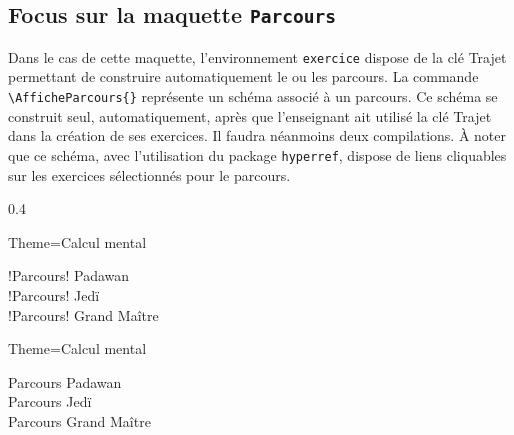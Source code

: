 \documentclass[12pt,french]{article}
\newcommand\Cle[1]{%
  {\sffamily\textlangle #1\textrangle}%
}%
\begin{document}
\subsection*{Focus sur la maquette \lstinline!Parcours!}
Dans le cas de cette maquette, l'environnement \lstinline!exercice! dispose de la clé \Cle{Trajet} permettant de construire automatiquement le ou les parcours. La commande \lstinline!\AfficheParcours{}! représente un schéma associé à un parcours. Ce schéma se construit seul, automatiquement, après que l'enseignant ait utilisé la clé \Cle{Trajet} dans la création de ses exercices. Il faudra néanmoins deux compilations. \`A noter que ce schéma, avec l'utilisation du package \lstinline!hyperref!, dispose de liens cliquables sur les exercices sélectionnés pour le parcours.
\begin{Codes}[listing only,listing options={frame=,escapechar=!}]{0.4}{\small}
\begin{Maquette}[Parcours]{Theme=Calcul mental}
  \begin{description}
  \item[!Parcours! Padawan] 
  \item[!Parcours! Jedï] 
  \item[!Parcours! Grand Maître] 
  \end{description}
  \begin{exercice}[Trajet={Padawan,Jedi,GrandMaitre}]
    
  \end{exercice}
  \begin{exercice}[Trajet={Padawan,Jedi}]
    
  \end{exercice}
  \begin{exercice}[Trajet={Padawan}]
    
  \end{exercice}
\end{Maquette}
\end{Codes}
\begin{Maquette}[Parcours]{Theme=Calcul mental}
  \begin{description}
  \item[Parcours Padawan] 
  \item[Parcours Jedï] 
  \item[Parcours Grand Maître] 
  \end{description}
  \begin{exercice}[Trajet={Padawan,Jedi,GrandMaitre}]
    
  \end{exercice}
  \begin{exercice}[Trajet={Padawan,Jedi}]
    
  \end{exercice}
  \begin{exercice}[Trajet={Padawan}]
    
  \end{exercice}
\end{Maquette}
\clearpage
\end{document}
